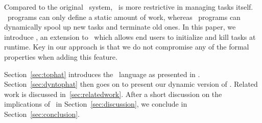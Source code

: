 Compared to the original \ITASKS\ system, \TOPHAT\ is more restrictive in managing tasks itself.
\TOPHAT\ programs can only define a static amount of work, whereas \ITASKS\ programs can dynamically spool up new tasks and terminate old ones.
In this paper, we introduce \DYNTOPHAT, an extension to \TOPHAT\ which allows end users to initialize and kill tasks at runtime.
Key in our approach is that we do not compromise any of the formal properties when adding this feature.



Section~\ref{sec:tophat} introduces the \TOPHAT\ language as presented in \citet{Steenvoorden22}.
Section~\ref{sec:dyntophat} then goes on to present our dynamic version of \TOPHAT.
Related work is discussed in~\ref{sec:relatedwork}. After a short discussion on the implications of \DYNTOPHAT\ in Section~\ref{sec:discussion}, we conclude in Section~\ref{sec:conclusion}.
